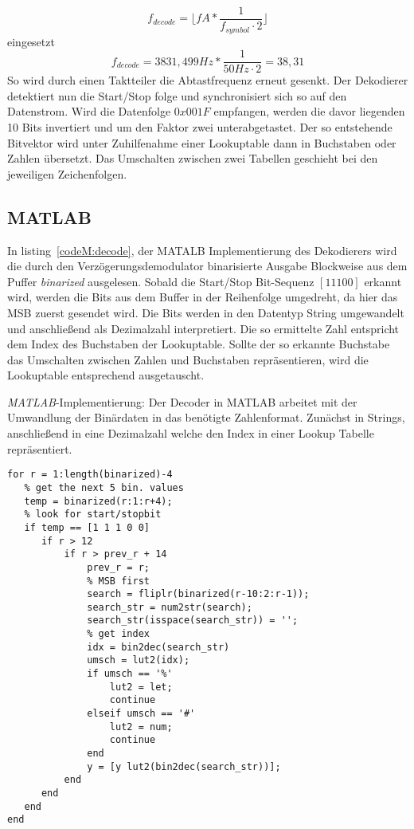 \documentclass{article}
\begin{document}
$$
f_{decode} = \lfloor fA * \frac{1}{f_{symbol} \cdot 2}\rfloor 
$$
eingesetzt
$$
f_{decode} = 3831,499Hz * \frac{1}{50Hz\cdot 2} = 38,31
$$
So wird durch einen Taktteiler die Abtastfrequenz erneut gesenkt. Der Dekodierer detektiert nun die Start/Stop folge und synchronisiert sich so auf den Datenstrom. Wird die Datenfolge $0x001F$ empfangen, werden die davor liegenden 10 Bits invertiert und um den Faktor zwei unterabgetastet. Der so entstehende Bitvektor wird unter Zuhilfenahme einer Lookuptable dann in Buchstaben oder Zahlen übersetzt. Das Umschalten zwischen zwei Tabellen geschieht bei den jeweiligen Zeichenfolgen.
\subsection{MATLAB}
In listing~\ref{codeM:decode}, der MATALB Implementierung des Dekodierers wird die durch den Verzögerungsdemodulator binarisierte Ausgabe
Blockweise aus dem Puffer \textit{binarized} ausgelesen. Sobald die Start/Stop Bit-Sequenz $[1 1 1 0 0]$ erkannt wird, werden die Bits aus dem Buffer
in der Reihenfolge umgedreht, da hier das MSB zuerst gesendet wird. Die Bits werden in den Datentyp String umgewandelt und anschließend
als Dezimalzahl interpretiert. Die so ermittelte Zahl entspricht dem Index des Buchstaben der Lookuptable. 
Sollte der so erkannte Buchstabe das Umschalten zwischen Zahlen und Buchstaben repräsentieren, wird die Lookuptable
entsprechend ausgetauscht. 
\begin{listing}\label{codeM:decode}
    \caption{\textit{MATLAB}-Implementierung: Der Decoder in MATLAB arbeitet mit der Umwandlung der Binärdaten in das benötigte Zahlenformat. Zunächst in Strings, 
    anschließend in eine Dezimalzahl welche den Index in einer Lookup Tabelle repräsentiert.}
    \begin{verbatim}
for r = 1:length(binarized)-4
   % get the next 5 bin. values
   temp = binarized(r:1:r+4);
   % look for start/stopbit
   if temp == [1 1 1 0 0]
      if r > 12
          if r > prev_r + 14 
              prev_r = r;
              % MSB first
              search = fliplr(binarized(r-10:2:r-1));
              search_str = num2str(search);
              search_str(isspace(search_str)) = '';
              % get index
              idx = bin2dec(search_str)
              umsch = lut2(idx);
              if umsch == '%'
                  lut2 = let;
                  continue
              elseif umsch == '#'
                  lut2 = num;
                  continue
              end
              y = [y lut2(bin2dec(search_str))];
          end
      end
   end
end
\end{verbatim}
\end{listing}
\end{document}
